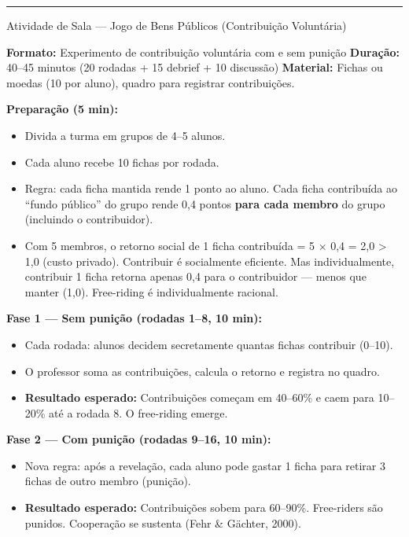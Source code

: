 \documentclass[11pt,twoside,openright]{book}
\providecommand{\tightlist}{\setlength{\itemsep}{0pt}\setlength{\parskip}{0pt}}
\begin{document}
\begin{center}\rule{0.5\linewidth}{0.5pt}\end{center}

\begin{classroombox}{Atividade de Sala — Jogo de Bens Públicos (Contribuição Voluntária)}

\textbf{Formato:} Experimento de contribuição voluntária com e sem
punição \textbf{Duração:} 40--45 minutos (20 rodadas + 15 debrief + 10
discussão) \textbf{Material:} Fichas ou moedas (10 por aluno), quadro
para registrar contribuições.

\textbf{Preparação (5 min):}

\begin{itemize}
\tightlist
\item
  Divida a turma em grupos de 4--5 alunos.
\item
  Cada aluno recebe 10 fichas por rodada.
\item
  Regra: cada ficha mantida rende 1 ponto ao aluno. Cada ficha
  contribuída ao ``fundo público'' do grupo rende 0,4 pontos
  \textbf{para cada membro} do grupo (incluindo o contribuidor).
\item
  Com 5 membros, o retorno social de 1 ficha contribuída = 5 × 0,4 = 2,0
  \textgreater{} 1,0 (custo privado). Contribuir é socialmente
  eficiente. Mas individualmente, contribuir 1 ficha retorna apenas 0,4
  para o contribuidor --- menos que manter (1,0). Free-riding é
  individualmente racional.
\end{itemize}

\textbf{Fase 1 --- Sem punição (rodadas 1--8, 10 min):}

\begin{itemize}
\tightlist
\item
  Cada rodada: alunos decidem secretamente quantas fichas contribuir
  (0--10).
\item
  O professor soma as contribuições, calcula o retorno e registra no
  quadro.
\item
  \textbf{Resultado esperado:} Contribuições começam em 40--60\% e caem
  para 10--20\% até a rodada 8. O free-riding emerge.
\end{itemize}

\textbf{Fase 2 --- Com punição (rodadas 9--16, 10 min):}

\begin{itemize}
\tightlist
\item
  Nova regra: após a revelação, cada aluno pode gastar 1 ficha para
  retirar 3 fichas de outro membro (punição).
\item
  \textbf{Resultado esperado:} Contribuições sobem para 60--90\%.
  Free-riders são punidos. Cooperação se sustenta (Fehr \& Gächter,
  2000).
\end{itemize}


\end{classroombox}
\end{document}
